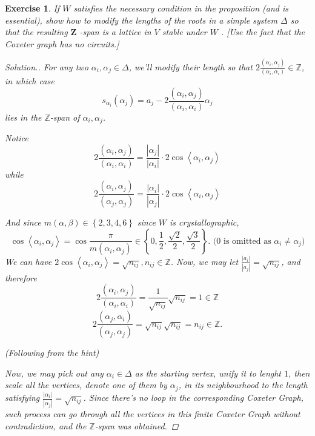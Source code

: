 \documentclass{article}
\theoremstyle{breakstyle}
\newtheorem{exercise}{Exercise}[section]
\newenvironment{solution}
  {\begin{proof}[Solution.]\renewcommand{\qedsymbol}{}}
  {\end{proof}}
\begin{document}
\begin{exercise}
If $W$ satisfies the necessary condition in the proposition (and is essential),
show how to modify the lengths of the roots in a simple system $\Delta$ so that
the resulting $\mathbf{Z}$ -span is a lattice in $V$ stable under $W$ . [Use the
fact that the Coxeter graph has no circuits.]

\begin{solution}
    For any two $\alpha_{i},\alpha_{j}\in \Delta$, we'll modify their length
    so that $2\frac{\left( \alpha_{i},\alpha_{j} \right) }{\left(
    \alpha_{i},\alpha_{i} \right) }\in \mathbb{Z}$, in which case
    $$
    s_{\alpha_{i}}\left( \alpha_{j} \right) =a_{j}-2\frac{\left(
    \alpha_{i},\alpha_{j} \right) }{\left( \alpha_{i},\alpha_{i} \right)
    }\alpha_{j}
    $$
    lies in the $\mathbb{Z}$-span of $\alpha_{i},\alpha_{j}$.

    Notice
    $$
    2\frac{\left( \alpha_{i},\alpha_{j} \right) }{\left(
    \alpha_{i},\alpha_{i} \right) }=\frac{\left| \alpha_{j} \right| }{\left|
    \alpha_{i} \right| }\cdot 2\cos\left< \alpha_{i},\alpha_{j} \right> 
    $$
    while
    $$
    2\frac{\left( \alpha_{i},\alpha_{j} \right) }{\left(
    \alpha_{j},\alpha_{j} \right) }=\frac{\left| \alpha_{i} \right| }{\left|
    \alpha_{j} \right| }\cdot 2\cos\left< \alpha_{i},\alpha_{j} \right> 
    $$
    
    And since $m\left( \alpha,\beta \right) \in \left\{ 2,3,4,6 \right\} $ since
    $W$ is crystallographic,
    $$
    \cos\left< \alpha_{i},\alpha_{j} \right> =\cos{\frac{\pi}{m\left(
    \alpha_{i},\alpha_{j} \right) }}\in \left\{ 0,\frac{1}{2},\frac{\sqrt{2}
    }{2},\frac{\sqrt{3} }{2} \right\}\text{.   ($0$ is omitted as $\alpha_{i}\neq
    \alpha_{j}$)}
    $$
    We can have $2\cos\left< \alpha_{i},\alpha_{j} \right>
    =\sqrt{n_{ij}},n_{ij}\in \mathbb{Z} $. Now, we may let $\frac{\left| a_{i}
    \right| }{\left| a_{j} \right| }=\sqrt{n_{ij}} $, and therefore
    $$
    2\frac{\left( \alpha_{i},\alpha_{j} \right) }{\left( \alpha_{i},\alpha_{i}
    \right) }=\frac{1}{\sqrt{n_{ij}} }\sqrt{n_{ij}} =1\in \mathbb{Z}
    $$
    $$
    2\frac{\left( \alpha_{j},\alpha_{i} \right) }{\left( \alpha_{j},\alpha_{j}
    \right) }=\sqrt{n_{ij}} \sqrt{n_{ij}} =n_{ij}\in \mathbb{Z}
    .$$

    \emph{(Following from the hint)}

    Now, we may pick out any $\alpha_{i}\in \Delta$ as the starting vertex,
    unify it to lenght $1$, then scale all the vertices, denote one of them by
    $\alpha_{j}$, in its neighbourhood to the length satisfying $\frac{\left|
    \alpha_{i} \right| }{\left| \alpha_{j}\right| }=\sqrt{n_{ij}} $. Since
    there's no loop in the corresponding Coxeter Graph, such process can go
    through all the vertices in this finite Coxeter Graph without contradiction,
    and the $\mathbb{Z}$-span was obtained.
\end{solution}

\end{exercise}
\end{document}
